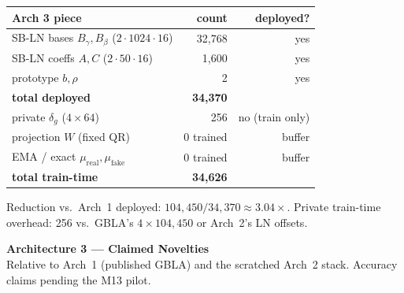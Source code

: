 \documentclass[11pt]{article}
\begin{document}
\vspace{6mm}
\begin{center}
\small
\begin{tabular}{L{70mm}rr}
\toprule
Arch 3 piece & count & deployed? \\
\midrule
SB-LN bases \(B_\gamma,B_\beta\) (\(2{\cdot}1024{\cdot}16\)) & 32{,}768 & yes \\
SB-LN coeffs \(A,C\) (\(2{\cdot}50{\cdot}16\)) & 1{,}600 & yes \\
prototype \(b,\rho\) & 2 & yes \\
\textbf{total deployed} & \textbf{34{,}370} & \\
\midrule
private \(\delta_g\) (\(4{\times}64\)) & 256 & no (train only) \\
projection \(W\) (fixed QR) & 0 trained & buffer \\
EMA / exact \(\mu_\text{real},\mu_\text{fake}\) & 0 trained & buffer \\
\textbf{total train-time} & \textbf{34{,}626} & \\
\bottomrule
\end{tabular}
\end{center}

\vfill
{\small Reduction vs.\ Arch~1 deployed: \(104{,}450/34{,}370\approx3.04\times\). Private train-time overhead: 256 vs.\ GBLA's \(4{\times}104{,}450\) or Arch~2's LN offsets.}

\newpage
\begin{center}
{\Large\bfseries Architecture 3 --- Claimed Novelties}\\[2pt]
{\small Relative to Arch~1 (published GBLA) and the scratched Arch~2 stack. Accuracy claims pending the M13 pilot.}
\end{center}
\vspace{3mm}
\end{document}
